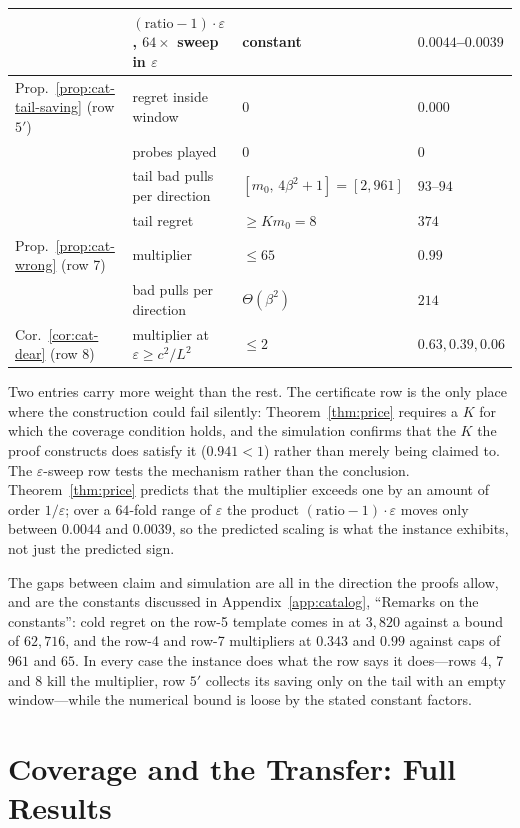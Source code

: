 \documentclass{article}
\theoremstyle{definition}
\theoremstyle{remark}
\newcommand{\eps}{\varepsilon}
\theoremstyle{remark}
\begin{document}
\begin{table}[h]
\begin{tabular}{@{}llll@{}}
 & $(\text{ratio}-1)\cdot\eps$, $64\times$ sweep in $\eps$ & constant & $0.0044$--$0.0039$ \\
\midrule
Prop.~\ref{prop:cat-tail-saving} (row $5'$) & regret inside window & $0$ & $0.000$ \\
 & probes played & $0$ & $0$ \\
 & tail bad pulls per direction & $[m_0,\,4\beta^2{+}1]=[2,961]$ & $93$--$94$ \\
 & tail regret & $\ge Km_0=8$ & $374$ \\
\midrule
Prop.~\ref{prop:cat-wrong} (row 7) & multiplier & $\le65$ & $0.99$ \\
 & bad pulls per direction & $\Theta(\beta^2)$ & $214$ \\
\midrule
Cor.~\ref{cor:cat-dear} (row 8) & multiplier at $\eps\ge c^2/L^2$ & $\le2$ & $0.63,0.39,0.06$ \\
\bottomrule
\end{tabular}
\end{table}

Two entries carry more weight than the rest. The certificate row is the only
place where the construction could fail silently: Theorem~\ref{thm:price}
requires a $K$ for which the coverage condition holds, and the simulation
confirms that the $K$ the proof constructs does satisfy it
($0.941<1$) rather than merely being claimed to. The $\eps$-sweep row tests the
mechanism rather than the conclusion. Theorem~\ref{thm:price} predicts that
the multiplier exceeds one by an amount of order $1/\eps$; over a $64$-fold
range of $\eps$ the product $(\text{ratio}-1)\cdot\eps$ moves only between
$0.0044$ and $0.0039$, so the predicted scaling is what the instance exhibits,
not just the predicted sign.

The gaps between claim and simulation are all in the direction the proofs
allow, and are the constants discussed in
Appendix~\ref{app:catalog}, ``Remarks on the constants'': cold regret on the
row-5 template comes in at $3{,}820$ against a bound of $62{,}716$, and the
row-4 and row-7 multipliers at $0.343$ and $0.99$ against caps of $961$ and
$65$. In every case the instance does what the row says it does---rows 4, 7
and 8 kill the multiplier, row $5'$ collects its saving only on the tail with
an empty window---while the numerical bound is loose by the stated constant
factors.

\section{Coverage and the Transfer: Full Results}
\label{app:two-channel}
\end{document}
